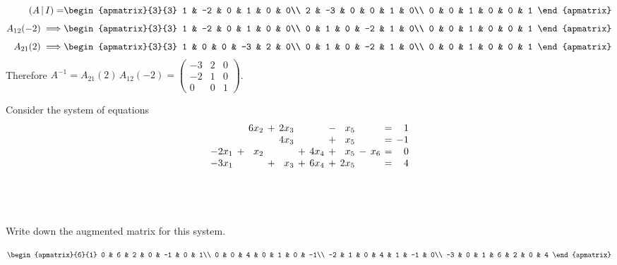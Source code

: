 \documentclass[a4paper]{article}
\begin{document}
\begin{align*}
(A\,|\,I) = &\begin{apmatrix}{3}{3}
	1 & -2 & 0 & 1 & 0 & 0\\
	2 & -3 & 0 & 0 & 1 & 0\\
	0 & 0 & 1 & 0 & 0 & 1
\end{apmatrix}\\[1ex]
A_{12}(-2) \implies &\begin{apmatrix}{3}{3}
	1 & -2 & 0 & 1 & 0 & 0\\
	0 & 1 & 0 & -2 & 1 & 0\\
	0 & 0 & 1 & 0 & 0 & 1
\end{apmatrix}\\[1ex]
A_{21}(2) \implies &\begin{apmatrix}{3}{3}
	1 & 0 & 0 & -3 & 2 & 0\\
	0 & 1 & 0 & -2 & 1 & 0\\
	0 & 0 & 1 & 0 & 0 & 1
\end{apmatrix}
\end{align*}
Therefore $A^{-1} = A_{21}(2)\, A_{12}(-2) = \begin{pmatrix}-3 & 2 & 0\\ -2 & 1 & 0\\ 0 & 0 & 1\end{pmatrix}$.


\begin{questionbody}
Consider the system of equations \[
\arraycolsep=2pt
\begin{array}{rcrcrcrcrcrcr}
      & & 6x_2 &+& 2x_3 & &      &-& x_5  & &     &=& 1\\
      & &      & & 4x_3 & &      &+& x_5  & &     &=& -1\\
-2x_1 &+& x_2  & &      &+& 4x_4 &+& x_5  &-& x_6 &=& 0\\
-3x_1 & &      &+& x_3  &+& 6x_4 &+& 2x_5 & &     &=& 4
\end{array}\]
\end{questionbody}

\subsection{~} %

\begin{questionbody}
Write down the augmented matrix for this system.
\end{questionbody}

$$\begin{apmatrix}{6}{1}
0 & 6 & 2 & 0 & -1 & 0 & 1\\
0 & 0 & 4 & 0 & 1 & 0 & -1\\
-2 & 1 & 0 & 4 & 1 & -1 & 0\\
-3 & 0 & 1 & 6 & 2 & 0 & 4
\end{apmatrix}$$
\end{document}
